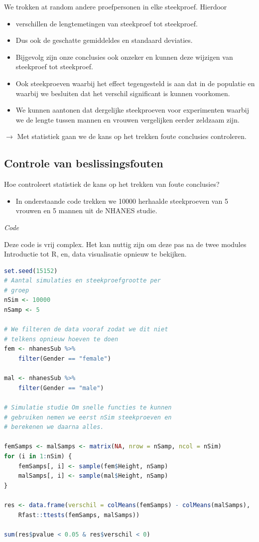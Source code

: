 \documentclass[
  12pt,dutch,coursenotes]{book}
\providecommand{\tightlist}{%
  \setlength{\itemsep}{0pt}\setlength{\parskip}{0pt}}
\theoremstyle{definition}
\theoremstyle{definition}
\theoremstyle{definition}
\theoremstyle{definition}
\theoremstyle{remark}
\begin{document}
We trokken at random andere proefpersonen in elke steekproef. Hierdoor

\begin{itemize}
\item
  verschillen de lengtemetingen van steekproef tot steekproef.
\item
  Dus ook de geschatte gemiddeldes en standaard deviaties.
\item
  Bijgevolg zijn onze conclusies ook onzeker en kunnen deze wijzigen van steekproef tot steekproef.
\item
  Ook steekproeven waarbij het effect tegengesteld is aan dat in de populatie en waarbij we besluiten dat het verschil significant is kunnen voorkomen.
\item
  We kunnen aantonen dat dergelijke steekproeven voor experimenten waarbij we de lengte tussen mannen en vrouwen vergelijken eerder zeldzaam zijn.
\end{itemize}

\(\rightarrow\) Met statistiek gaan we de kans op het trekken foute conclusies controleren.

\hypertarget{controle-van-beslissingsfouten}{%
\subsection{Controle van beslissingsfouten}\label{controle-van-beslissingsfouten}}

Hoe controleert statistiek de kans op het trekken van foute conclusies?

\begin{itemize}
\tightlist
\item
  In onderstaande code trekken we 10000 herhaalde steekproeven van 5 vrouwen en 5 mannen uit de NHANES studie.
\end{itemize}

\emph{Code}

Deze code is vrij complex. Het kan nuttig zijn om deze pas na de twee modules Introductie tot R, en, data visualisatie opnieuw te bekijken.

\begin{lstlisting}[language=R]
set.seed(15152)
# Aantal simulaties en steekproefgrootte per
# groep
nSim <- 10000
nSamp <- 5

# We filteren de data vooraf zodat we dit niet
# telkens opnieuw hoeven te doen
fem <- nhanesSub %>%
    filter(Gender == "female")

mal <- nhanesSub %>%
    filter(Gender == "male")

# Simulatie studie Om snelle functies te kunnen
# gebruiken nemen we eerst nSim steekproeven en
# berekenen we daarna alles.

femSamps <- malSamps <- matrix(NA, nrow = nSamp, ncol = nSim)
for (i in 1:nSim) {
    femSamps[, i] <- sample(fem$Height, nSamp)
    malSamps[, i] <- sample(mal$Height, nSamp)
}

res <- data.frame(verschil = colMeans(femSamps) - colMeans(malSamps),
    Rfast::ttests(femSamps, malSamps))

sum(res$pvalue < 0.05 & res$verschil < 0)
\end{lstlisting}
\end{document}
